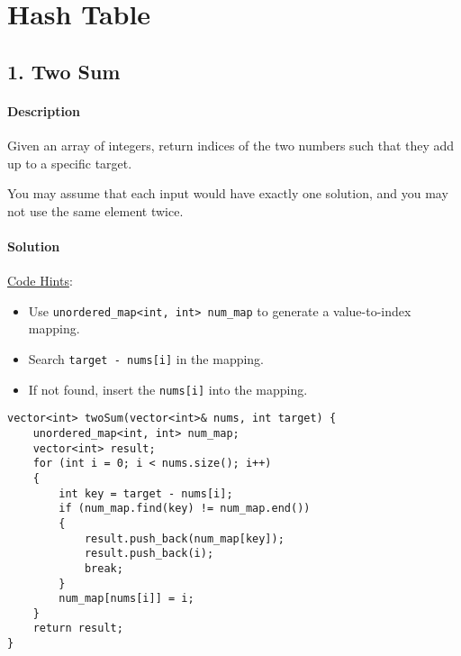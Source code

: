 \section{Hash Table}

\subsection{1. Two Sum}

\paragraph{\color{white} \colorbox{Mahogany}{Description}}

Given an array of integers, return indices of the two numbers such that they add up to a specific target.

You may assume that each input would have exactly one solution, and you may not use the same element twice.

\paragraph{\color{white} \colorbox{OliveGreen}{Solution}}
\underline{Code Hints}:
\begin{itemize}
    \item Use \texttt{unordered_map<int, int> num_map} to generate a value-to-index mapping.
    \item Search \texttt{target - nums[i]} in the mapping.
    \item If not found, insert the \texttt{nums[i]} into the mapping.
\end{itemize}

\begin{verbatim}
vector<int> twoSum(vector<int>& nums, int target) {
    unordered_map<int, int> num_map;
    vector<int> result;
    for (int i = 0; i < nums.size(); i++)
    {
        int key = target - nums[i];
        if (num_map.find(key) != num_map.end())
        {
            result.push_back(num_map[key]);
            result.push_back(i);
            break;
        }
        num_map[nums[i]] = i;
    }
    return result;
}
\end{verbatim}